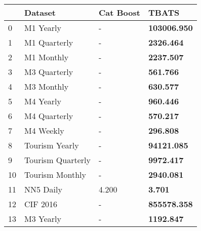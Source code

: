\begin{tabular}{llll}
\toprule
 & Dataset & Cat Boost & TBATS \\
\midrule
0 & M1 Yearly & - & \textbf{103006.950} \\
1 & M1 Quarterly & - & \textbf{2326.464} \\
2 & M1 Monthly & - & \textbf{2237.507} \\
3 & M3 Quarterly & - & \textbf{561.766} \\
4 & M3 Monthly & - & \textbf{630.577} \\
5 & M4 Yearly & - & \textbf{960.446} \\
6 & M4 Quarterly & - & \textbf{570.217} \\
7 & M4 Weekly & - & \textbf{296.808} \\
8 & Tourism Yearly & - & \textbf{94121.085} \\
9 & Tourism Quarterly & - & \textbf{9972.417} \\
10 & Tourism Monthly & - & \textbf{2940.081} \\
11 & NN5 Daily & 4.200 & \textbf{3.701} \\
12 & CIF 2016 & - & \textbf{855578.358} \\
13 & M3 Yearly & - & \textbf{1192.847} \\
\bottomrule
\end{tabular}
